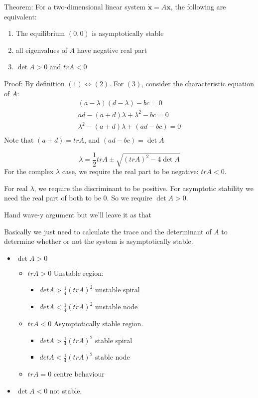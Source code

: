 \documentclass{/home/janmebows/Documents/LatexTemplates/myassignment}
\begin{document}
Theorem:
For a two-dimensional linear system $\dot{\mathbf{x}}= A \mathbf{x}$, the following are equivalent:

\begin{enumerate}
    \item The equilibrium $(0,0)$ is asymptotically stable
    \item all eigenvalues of $A$ have negative real part
    \item $\det A> 0$ and $tr A < 0$
\end{enumerate}

Proof:
By definition $(1) \Leftrightarrow (2)$.
For $(3)$, consider the characteristic equation of $A$:
\begin{align*}
    (a-\lambda) (d-\lambda) - bc = 0\\
    ad - (a+d)\lambda + \lambda ^2  - bc =0\\
    \lambda ^2  - (a+d)\lambda +(ad- bc) =0\\
\end{align*}
Note that $(a+d) = tr A$, and $(ad-bc) = \det A$

\[\lambda = \frac12 trA \pm \sqrt{(tr A)^2 - 4\det A}\]
For the complex $\lambda$ case, we require the real part to be negative: $tr A <0$.

For real $\lambda$, we require the discriminant to be positive. For asymptotic stability we need the real part of both to be $0$. So we require $\det A > 0$.


Hand wave-y argument but we'll leave it as that


Basically we just need to calculate the trace and the determinant of $A$ to determine whether or not the system is asymptotically stable.
\begin{itemize}
    \item $\det A > 0$
    \begin{itemize}
         \item $tr A > 0$ Unstable region:
         \begin{itemize}
             \item $det A > \frac14 (tr A)^2$ unstable spiral
             \item $det A < \frac14 (tr A)^2$ unstable node
         \end{itemize}
         \item $tr A < 0$ Asymptotically stable region.
         \begin{itemize}
             \item $det A > \frac14 (tr A)^2$ stable spiral
             \item $det A < \frac14 (tr A)^2$ stable node
         \end{itemize}
         \item $tr A = 0$ centre behaviour
     \end{itemize} 
    \item $\det A < 0$ not stable.
\end{itemize}
\end{document}

